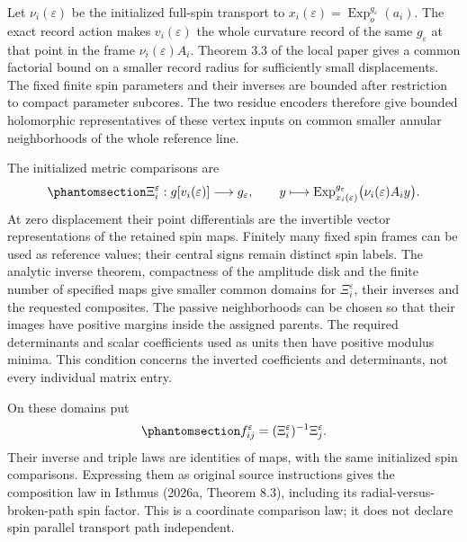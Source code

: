 \documentclass[
  english,
  11pt,
  reqno]{amsart}
\begin{document}
Let \(\nu_i(\varepsilon)\) be the initialized full-spin transport to
\(x_i(\varepsilon)=\operatorname{Exp}^{g_\varepsilon}_o(a_i)\). The
exact record action makes \(v_i(\varepsilon)\) the whole curvature
record of the same \(g_\varepsilon\) at that point in the frame
\(\nu_i(\varepsilon)A_i\). Theorem 3.3 of the local paper gives a common
factorial bound on a smaller record radius for sufficiently small
displacements. The fixed finite spin parameters and their inverses are
bounded after restriction to compact parameter subcores. The two residue
encoders therefore give bounded holomorphic representatives of these
vertex inputs on common smaller annular neighborhoods of the whole
reference line.

The initialized metric comparisons are
\begin{equation}\protect\phantomsection\label{eq:source-compatible-initialized-comparisons}{
\Xi_i^\varepsilon:g[v_i(\varepsilon)]\longrightarrow g_\varepsilon,
\qquad
y\longmapsto
\operatorname{Exp}^{g_\varepsilon}_{x_i(\varepsilon)}
                    \bigl(\nu_i(\varepsilon)A_i y\bigr).
}\end{equation} At zero displacement their point differentials are the
invertible vector representations of the retained spin maps. Finitely
many fixed spin frames can be used as reference values; their central
signs remain distinct spin labels. The analytic inverse theorem,
compactness of the amplitude disk and the finite number of specified
maps give smaller common domains for \(\Xi_i^\varepsilon\), their
inverses and the requested composites. The passive neighborhoods can be
chosen so that their images have positive margins inside the assigned
parents. The required determinants and scalar coefficients used as units
then have positive modulus minima. This condition concerns the inverted
coefficients and determinants, not every individual matrix entry.

On these domains put
\begin{equation}\protect\phantomsection\label{eq:source-compatible-star-comparisons}{
f_{ij}^\varepsilon
=(\Xi_i^\varepsilon)^{-1}\Xi_j^\varepsilon.
}\end{equation} Their inverse and triple laws are identities of maps,
with the same initialized spin comparisons. Expressing them as original
source instructions gives the composition law in Isthmus (2026a, Theorem
8.3), including its radial-versus-broken-path spin factor. This is a
coordinate comparison law; it does not declare spin parallel transport
path independent.
\end{document}
